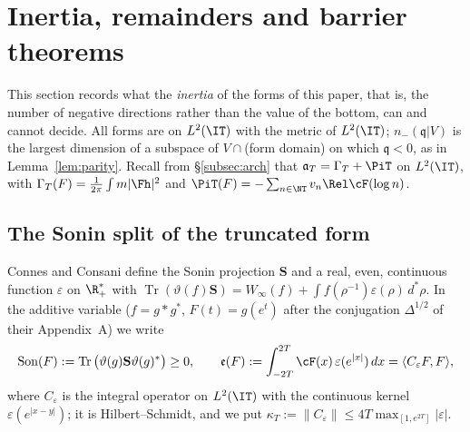 
\section{Inertia, remainders and barrier theorems}\label{sec:inertia}

This section records what the \emph{inertia} of the forms of this paper, that is, the number of
negative directions rather than the value of the bottom, can and cannot decide. All forms are
on $L^2(\IT)$ with the metric of $L^2(\IT)$; $n_-(\mathfrak q|V)$ is the largest dimension of a
subspace of $V\cap$(form domain) on which $\mathfrak q<0$, as in Lemma~\ref{lem:parity}. Recall from
\S\ref{subsec:arch} that $\mathfrak a_T=\Gamma_T+\PiT$ on $L^2(\IT)$, with
$\Gamma_T(F)=\frac1{2\pi}\int m|\Fh|^2$ and $\PiT(F)=-\sum_{n\in\NT}v_n\Rel\cF(\log n)$.

\subsection{The Sonin split of the truncated form}
Connes and Consani \cite[Thm.~4.7, (83)--(84)]{ConnesConsani2021} define the Sonin projection $\mathbf S$
and a real, even, continuous function $\varepsilon$ on $\R_+^*$ with
$\operatorname{Tr}(\vartheta(f)\mathbf S)=W_\infty(f)+\int f(\rho^{-1})\varepsilon(\rho)\,d^*\rho$. In the additive
variable ($f=g*g^*$, $F(t)=g(e^t)$ after the conjugation $\Delta^{1/2}$ of their Appendix~A) we write
\[
\mathrm{Son}(F):=\operatorname{Tr}\big(\vartheta(g)\mathbf S\vartheta(g)^*\big)\ge0,\qquad
\mathfrak e(F):=\int_{-2T}^{2T}\cF(x)\,\varepsilon(e^{|x|})\,dx=\langle C_\varepsilon F,F\rangle ,
\]
where $C_\varepsilon$ is the integral operator on $L^2(\IT)$ with the continuous kernel $\varepsilon(e^{|x-y|})$;
it is Hilbert--Schmidt, and we put $\kappa_T:=\|C_\varepsilon\|\le4T\max_{[1,e^{2T}]}|\varepsilon|$.

